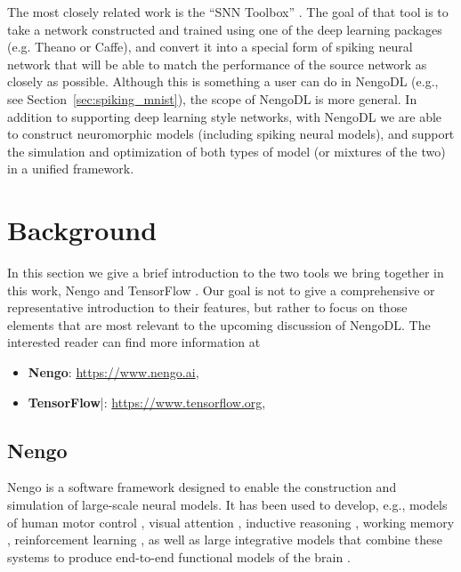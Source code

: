 \documentclass{article}
\begin{document}
The most closely related work is the ``SNN Toolbox'' \citep{Rueckauer2017}.  The goal of that tool is to take a network constructed and trained using one of the deep learning packages (e.g. Theano or Caffe), and convert it into a special form of spiking neural network that will be able to match the performance of the source network as closely as possible.  Although this is something a user can do in NengoDL (e.g., see Section~\ref{sec:spiking_mnist}), the scope of NengoDL is more general.  In addition to supporting deep learning style networks, with NengoDL we are able to construct neuromorphic models (including spiking neural models), and support the simulation and optimization of both types of model (or mixtures of the two) in a unified framework.

\section{Background}
\label{sec:background}

In this section we give a brief introduction to the two tools we bring together in this work, Nengo \citep{Bekolay2014} and TensorFlow \citep{Abadi2016}.  Our goal is not to give a comprehensive or representative introduction to their features, but rather to focus on those elements that are most relevant to the upcoming discussion of NengoDL.  The interested reader can find more information at

\begin{itemize}
\item {\bf Nengo}: \url{https://www.nengo.ai}, \citet{Bekolay2014}
\item {\bf TensorFlow}|: \url{https://www.tensorflow.org}, \citet{Abadi2016}
\end{itemize}

\subsection{Nengo}

Nengo is a software framework designed to enable the construction and simulation of large-scale neural models.  It has been used to develop, e.g., models of human motor control \citep{DeWolf2016}, visual attention \citep{Bobier2014}, inductive reasoning \citep{Rasmussen2014}, working memory \citep{Choo2010}, reinforcement learning \citep{Stewart2012,Rasmussen2017}, as well as large integrative models that combine these systems to produce end-to-end functional models of the brain \citep{Eliasmith2012a}.
\end{document}
